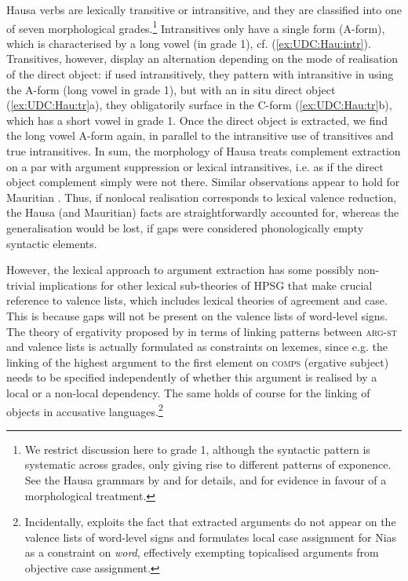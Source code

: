 \documentclass[output=paper
                ,modfonts
                ,nonflat
	        ,collection
	        ,collectionchapter
	        ,collectiontoclongg
 	        ,biblatex
                ,babelshorthands
                ,newtxmath
                ,draftmode
                ,colorlinks, citecolor=brown
]{./langsci/langscibook}
\begin{document}
{\begin{exe}
\end{exe}

\noindent
Hausa verbs are lexically transitive or intransitive, and they are
classified into one of seven morphological grades.\footnote{We
  restrict discussion here to grade 1, although the syntactic pattern
  is systematic across grades, only giving rise to different patterns
  of exponence. See the Hausa grammars by \citet{newman_p00} and
  \citet{jaggar01:_hausa} for details, and \citet{crysmann_b04yom} for
  evidence in favour of a morphological treatment. } Intransitives
only have a single form (A-form), which is characterised by a long
vowel (in grade 1), cf. (\ref{ex:UDC:Hau:intr}). Transitives, however,
display an alternation depending on the mode of realisation of the
direct object: if used intransitively, they pattern with intransitive
in using the A-form (long vowel in grade 1), but with an in situ
direct object (\ref{ex:UDC:Hau:tr}a), they obligatorily surface in the
C-form (\ref{ex:UDC:Hau:tr}b), which has a short vowel in grade
1. Once the direct object is extracted, we find the long vowel A-form
again, in parallel to the intransitive use of transitives and true
intransitives. In sum, the morphology of Hausa treats complement
extraction on a par with argument suppression or lexical
intransitives, i.e. as if the direct object complement simply were not
there. Similar observations appear to hold for Mauritian
\citep{Henri10}. Thus, if nonlocal realisation corresponds to lexical
valence reduction, the Hausa (and Mauritian) facts are
straightforwardly accounted for, whereas the generalisation would be
lost, if gaps were considered phonologically empty syntactic elements.


However, the lexical approach to argument extraction has some possibly
non-trivial implications for other lexical sub-theories of HPSG that
make crucial reference to valence lists, which includes lexical theories of
agreement and case. This is because gaps will not be present on the
valence lists of word-level signs. The theory of ergativity proposed by \citet{Manning:Sag:99} in terms of
linking patterns between \textsc{arg-st} and valence lists is
actually formulated as constraints on lexemes, since e.g. the linking
of the highest argument to the first element on \textsc{comps}
(ergative subject) needs to be specified independently of whether
this argument is realised by a local or a non-local dependency. The
same holds of course for the linking of objects in accusative
languages.\footnote{Incidentally, \citet{Crysmann:09} exploits the
  fact that extracted arguments do not appear on the valence lists of
  word-level signs and formulates local case assignment for Nias as a
  constraint on \textit{word}, effectively exempting topicalised
  arguments from objective case assignment. }

}
\end{document}
